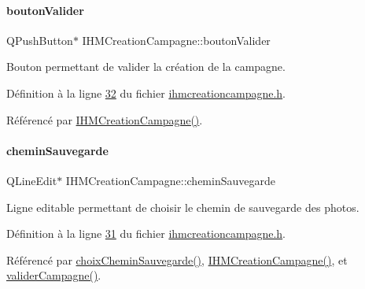 \paragraph{\texorpdfstring{bouton\+Valider}{boutonValider}}
{\footnotesize\ttfamily Q\+Push\+Button$\ast$ I\+H\+M\+Creation\+Campagne\+::bouton\+Valider\hspace{0.3cm}{\ttfamily [private]}}



Bouton permettant de valider la création de la campagne. 



Définition à la ligne \hyperlink{ihmcreationcampagne_8h_source_l00032}{32} du fichier \hyperlink{ihmcreationcampagne_8h_source}{ihmcreationcampagne.\+h}.



Référencé par \hyperlink{ihmcreationcampagne_8cpp_source_l00011}{I\+H\+M\+Creation\+Campagne()}.

\mbox{\label{class_i_h_m_creation_campagne_a95c12e2d42063f9c510704b87e3357da}} 
\paragraph{\texorpdfstring{chemin\+Sauvegarde}{cheminSauvegarde}}
{\footnotesize\ttfamily Q\+Line\+Edit$\ast$ I\+H\+M\+Creation\+Campagne\+::chemin\+Sauvegarde\hspace{0.3cm}{\ttfamily [private]}}



Ligne editable permettant de choisir le chemin de sauvegarde des photos. 



Définition à la ligne \hyperlink{ihmcreationcampagne_8h_source_l00031}{31} du fichier \hyperlink{ihmcreationcampagne_8h_source}{ihmcreationcampagne.\+h}.



Référencé par \hyperlink{ihmcreationcampagne_8cpp_source_l00104}{choix\+Chemin\+Sauvegarde()}, \hyperlink{ihmcreationcampagne_8cpp_source_l00011}{I\+H\+M\+Creation\+Campagne()}, et \hyperlink{ihmcreationcampagne_8cpp_source_l00071}{valider\+Campagne()}.

\mbox{\label{class_i_h_m_creation_campagne_a6b5ea4a52138016a07a37060669288ae}} 
